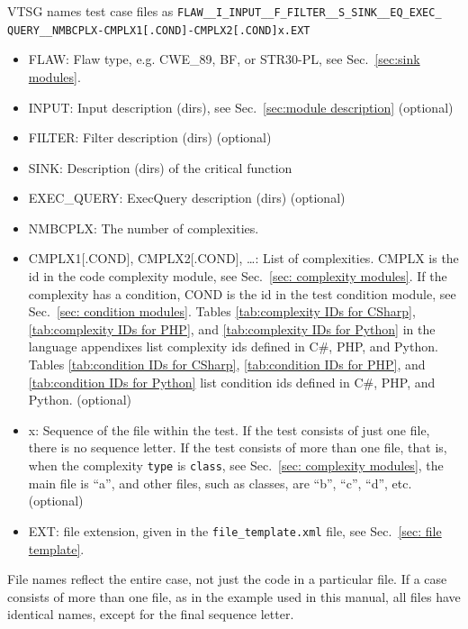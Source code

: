 \documentclass[12pt]{article}
\newcommand{\CSharp}{C{\fontseries{b}\selectfont\#}}
\begin{document}
VTSG names test case files as
\verb|FLAW__I_INPUT__F_FILTER__S_SINK__EQ_EXEC_| \\
\verb|QUERY__NMBCPLX-CMPLX1[.COND]-CMPLX2[.COND]x.EXT|
\begin{itemize}[nosep]
    \item FLAW: Flaw type, e.g. CWE\_89, BF, or STR30-PL, see
	Sec.~\ref{sec:sink modules}.
    \item INPUT: Input description (dirs), see Sec.~\ref{sec:module description} (optional)
    \item FILTER:  Filter description (dirs) (optional)
    \item SINK:  Description (dirs) of the critical function
    \item EXEC\_QUERY:  ExecQuery description (dirs) (optional)

    \item NMBCPLX:  The number of complexities.
    \item CMPLX1[.COND], CMPLX2[.COND], \ldots: List of complexities.
            CMPLX is the id in the code complexity module,
            see Sec.~\ref{sec: complexity modules}.
            If the complexity has a
            condition, COND is the id in the test condition module,
            see Sec.~\ref{sec: condition modules}.
            Tables \ref{tab:complexity IDs for CSharp},
            \ref{tab:complexity IDs for PHP}, and
            \ref{tab:complexity IDs for Python} in the language appendixes list
            complexity ids defined in \CSharp, PHP, and Python.
            Tables \ref{tab:condition IDs for CSharp},
            \ref{tab:condition IDs for PHP}, and
            \ref{tab:condition IDs for Python} list condition
            ids defined in \CSharp, PHP, and Python. (optional)
    \item x: Sequence of the file within the test.  If the test consists of just one
      file, there is no sequence letter.  If the test consists of more than one file,
      that is, when the complexity \verb|type| is \verb|class|,
      see Sec.~\ref{sec: complexity modules},
      the main file is ``a'', and other files, such as classes, are ``b'', ``c'',
      ``d'', etc. (optional)
    \item EXT: file extension, given in the \verb|file_template.xml| file, see
    Sec.~\ref{sec: file template}.
\end{itemize}

File names reflect the entire case, not just the code in a
particular file.  If a case consists of more than one file, as in the
example used in this manual, all files have
identical names, except for the final sequence letter.
\end{document}
